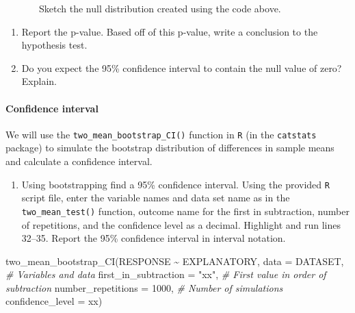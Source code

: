 \documentclass[
]{report}
\newenvironment{Shaded}{\begin{snugshade}}{\end{snugshade}}
\newcommand{\AttributeTok}[1]{\textcolor[rgb]{0.77,0.63,0.00}{#1}}
\newcommand{\CommentTok}[1]{\textcolor[rgb]{0.56,0.35,0.01}{\textit{#1}}}
\newcommand{\DecValTok}[1]{\textcolor[rgb]{0.00,0.00,0.81}{#1}}
\newcommand{\FunctionTok}[1]{\textcolor[rgb]{0.00,0.00,0.00}{#1}}
\newcommand{\NormalTok}[1]{#1}
\newcommand{\SpecialCharTok}[1]{\textcolor[rgb]{0.00,0.00,0.00}{#1}}
\newcommand{\StringTok}[1]{\textcolor[rgb]{0.31,0.60,0.02}{#1}}
\providecommand{\tightlist}{%
  \setlength{\itemsep}{0pt}\setlength{\parskip}{0pt}}
\begin{document}
~~~~~~~Sketch the null distribution created using the code above.

\vspace{1.5in}

\begin{enumerate}
\def\labelenumi{\arabic{enumi}.}
\setcounter{enumi}{7}
\item
  Report the p-value. Based off of this p-value, write a conclusion to the hypothesis test.
\item
  Do you expect the 95\% confidence interval to contain the null value of zero? Explain.
\end{enumerate}

\vspace{0.8in}

\hypertarget{confidence-interval-2}{%
\paragraph*{Confidence interval}\label{confidence-interval-2}}

We will use the \texttt{two\_mean\_bootstrap\_CI()} function in \texttt{R} (in the \texttt{catstats} package) to simulate the bootstrap distribution of differences in sample means and calculate a confidence interval.

\begin{enumerate}
\def\labelenumi{\arabic{enumi}.}
\setcounter{enumi}{9}
\tightlist
\item
  Using bootstrapping find a 95\% confidence interval. Using the provided \texttt{R} script file, enter the variable names and data set name as in the \texttt{two\_mean\_test()} function, outcome name for the first in subtraction, number of repetitions, and the confidence level as a decimal. Highlight and run lines 32--35. Report the 95\% confidence interval in interval notation.
\end{enumerate}

\begin{Shaded}
\begin{Highlighting}[]
\FunctionTok{two\_mean\_bootstrap\_CI}\NormalTok{(RESPONSE }\SpecialCharTok{\textasciitilde{}}\NormalTok{ EXPLANATORY, }\AttributeTok{data =}\NormalTok{ DATASET,  }\CommentTok{\# Variables and data}
                      \AttributeTok{first\_in\_subtraction =} \StringTok{"xx"}\NormalTok{, }\CommentTok{\# First value in order of subtraction}
                      \AttributeTok{number\_repetitions =} \DecValTok{1000}\NormalTok{,  }\CommentTok{\# Number of simulations}
                      \AttributeTok{confidence\_level =}\NormalTok{ xx)}
\end{Highlighting}
\end{Shaded}
\end{document}
